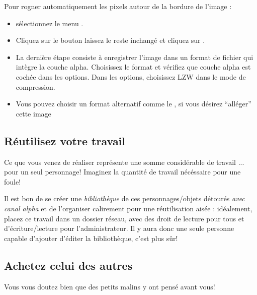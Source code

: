 \documentclass[a4paper,12pt,french]{sphinxmanual}
\begin{document}
Pour rogner automatiquement les pixels autour de la bordure de l'image :
\begin{itemize}
\item {} 
sélectionnez le menu .

\item {} 
Cliquez sur le bouton  laissez le reste inchangé et cliquez sur .

\item {} 
La dernière étape consiste à enregistrer l'image dans un format de fichier qui intègre la couche alpha. Choisissez le format  et vérifiez que couche alpha est cochée dans les options. Dans les options, choisissez LZW dans le mode de compression.

\item {} 
Vous pouvez choisir un format alternatif comme le , si vous désirez ``alléger'' cette image

\end{itemize}


\subsection{Réutilisez votre travail}
\label{psd/detourage:reutilisez-votre-travail}
Ce que vous venez de réaliser représente une somme considérable de travail ... pour un seul personnage! Imaginez la quantité de travail nécéssaire pour une foule!

Il est bon de se créer une \emph{bibliothèque} de ces personnages/objets détourés \emph{avec canal alpha} et de l'organiser calirement pour une réutilisation aisée : idéalement, placez ce travail dans un dossier réseau, avec des droit de lecture pour tous et d'écriture/lecture pour l'administrateur. Il y aura donc une seule personne capable d'ajouter d'éditer la bibliothèque, c'est plus sûr!


\subsection{Achetez celui des autres}
\label{psd/detourage:achetez-celui-des-autres}
Vous vous doutez bien que des petits malins y ont pensé avant vous!
\end{document}
